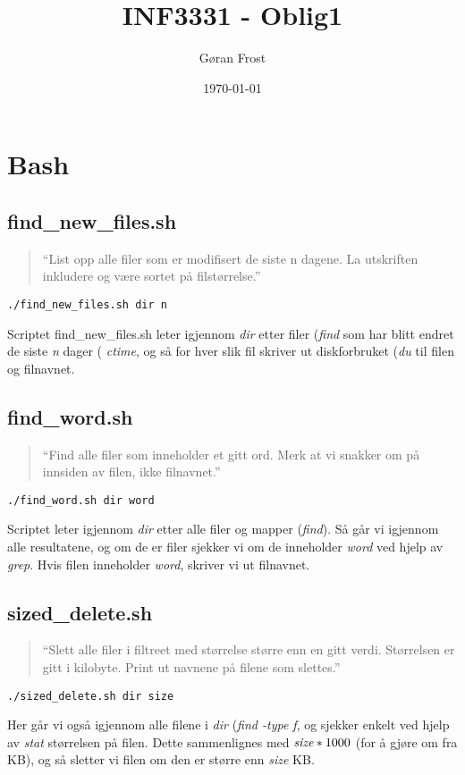 \documentclass{article}
\begin{document}
\title{INF3331 - Oblig1}

\author{Gøran Frost}
\date{\today}

\maketitle

\section{Bash}

\label{sec:calc}

\subsection{find\_new\_files.sh}
\label{sec:add}
\begin{quote}
``List opp alle filer som er modifisert de siste n dagene. La utskriften inkludere og være sortet på filstørrelse.''
\end{quote}
\begin{Verbatim}
./find_new_files.sh dir n
\end{Verbatim}
Scriptet find\_new\_files.sh leter igjennom \emph{dir} etter filer (\emph{find} som har blitt endret de siste \emph{n} dager ( \emph{ctime}, og så for hver slik fil skriver ut diskforbruket (\emph{du} til filen og filnavnet.

\label{sec:add:eq}
\subsection{find\_word.sh}
\begin{quote}
``Find alle filer som inneholder et gitt ord. Merk at vi snakker om på innsiden av
filen, ikke filnavnet.''
\end{quote}
\begin{Verbatim}
./find_word.sh dir word
\end{Verbatim}
Scriptet leter igjennom \emph{dir} etter alle filer og mapper (\emph{find}). Så går vi igjennom alle resultatene, og om de er filer sjekker vi om de inneholder \emph{word} ved hjelp av \emph{grep}. Hvis filen inneholder \emph{word}, skriver vi ut filnavnet. 

\subsection{sized\_delete.sh}
\begin{quote}
``Slett alle filer i filtreet med størrelse større enn en gitt verdi. Størrelsen er gitt
i kilobyte. Print ut navnene på filene som slettes.''
\end{quote}
\begin{Verbatim}
./sized_delete.sh dir size
\end{Verbatim}
Her går vi også igjennom alle filene i \emph{dir} (\emph{find -type f}, og sjekker enkelt ved hjelp
 av \emph{stat} størrelsen på filen. Dette sammenlignes med $\emph{size}*1000$ 
(for å gjøre om fra KB), og så sletter vi filen om den er større enn \emph{size} KB.  
\end{document}
